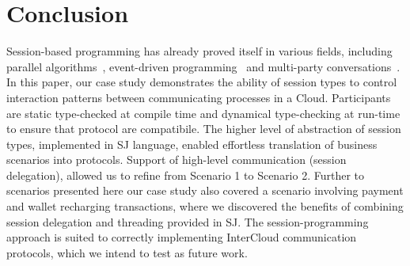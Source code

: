 \documentclass[10pt]{llncs}
\begin{document}
\section{Conclusion}
\label{sect:conclusion}
Session-based programming has already proved itself in various fields, including parallel algorithms~\cite{sj-parallel}, event-driven programming~\cite{event-driven-sj} and multi-party conversations~\cite{sj-business-protocols}.
In this paper, our case study demonstrates the ability of session types to control interaction patterns between communicating processes in a Cloud.
Participants are static type-checked at compile time and dynamical type-checking at run-time to ensure that protocol are compatibile.
The higher level of abstraction of session types, implemented in SJ language, enabled effortless translation of business scenarios into protocols.
Support of high-level communication (session delegation), allowed us to refine from Scenario 1 to Scenario 2.
Further to scenarios presented here our case study also covered a scenario involving payment and wallet recharging transactions, %
where we discovered the benefits of combining session delegation and threading provided in SJ.
The session-programming approach is suited to correctly implementing InterCloud communication protocols, which we intend to test as future work. %


%
\label{sect:bib}

%
%
%


\appendix




\end{document}
